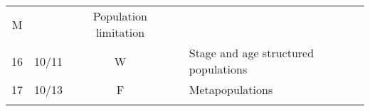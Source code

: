 \documentclass[]{article}
\begin{document}
\begin{longtable}[]{@{}ccclll@{}}
\begin{minipage}[t]{0.07\columnwidth}
M\strut
\end{minipage} & \begin{minipage}[t]{0.10\columnwidth}\raggedright\strut
\strut
\end{minipage} & \begin{minipage}[t]{0.12\columnwidth}\raggedright\strut
Population limitation\strut
\end{minipage} & \begin{minipage}[t]{0.12\columnwidth}\raggedright\strut
\strut
\end{minipage}\tabularnewline
\begin{minipage}[t]{0.13\columnwidth}\centering\strut
16\strut
\end{minipage} & \begin{minipage}[t]{0.08\columnwidth}\centering\strut
10/11\strut
\end{minipage} & \begin{minipage}[t]{0.07\columnwidth}\centering\strut
W\strut
\end{minipage} & \begin{minipage}[t]{0.10\columnwidth}\raggedright\strut
\strut
\end{minipage} & \begin{minipage}[t]{0.12\columnwidth}\raggedright\strut
Stage and age structured populations\strut
\end{minipage} & \begin{minipage}[t]{0.12\columnwidth}\raggedright\strut
\strut
\end{minipage}\tabularnewline
\begin{minipage}[t]{0.13\columnwidth}\centering\strut
17\strut
\end{minipage} & \begin{minipage}[t]{0.08\columnwidth}\centering\strut
10/13\strut
\end{minipage} & \begin{minipage}[t]{0.07\columnwidth}\centering\strut
F\strut
\end{minipage} & \begin{minipage}[t]{0.10\columnwidth}\raggedright\strut
\strut
\end{minipage} & \begin{minipage}[t]{0.12\columnwidth}\raggedright\strut
Metapopulations\strut
\end{minipage} & \begin{minipage}[t]{0.12\columnwidth}\raggedright\strut
\strut
\end{minipage}\tabularnewline
\begin{minipage}[t]{0.13\columnwidth}\centering\strut

\end{minipage}
\end{longtable}
\end{document}
